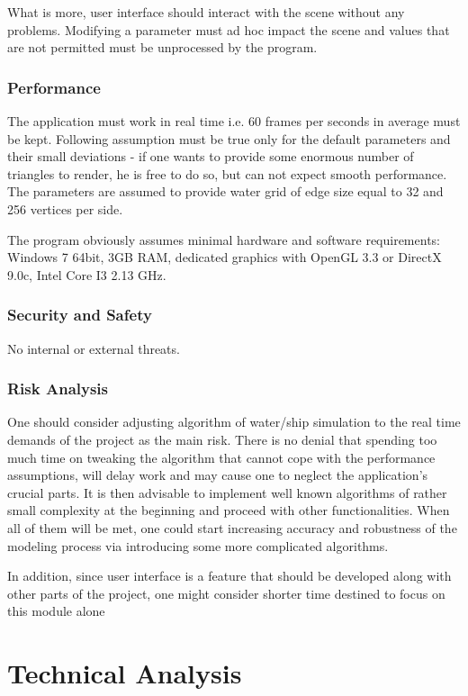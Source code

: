 \documentclass{report}
\begin{document}
What is more, user interface should interact with the scene without any problems. Modifying a parameter must ad hoc impact the scene and values that are not permitted must be unprocessed by the program.

\subsection{Performance}
The application must work in real time i.e. 60 frames per seconds in average must be kept. Following assumption must be true only for the default parameters and their small deviations - if one wants to provide some enormous number of triangles to render, he is free to do so, but can not expect smooth performance. The parameters are assumed to provide
water grid of edge size equal to 32 and 256 vertices per side.

The program obviously assumes minimal hardware and software requirements: Windows 7 64bit, 3GB RAM, dedicated graphics with OpenGL 3.3 or DirectX 9.0c, Intel Core I3 2.13 GHz.

\subsection{Security and Safety}
No internal or external threats.

\subsection{Risk Analysis}
One should consider adjusting algorithm of water/ship simulation to the real time demands of the project as the main risk. There is no denial that spending too much time on tweaking the algorithm that cannot cope with the performance assumptions, will delay work and may cause one to neglect the application’s crucial parts. It is then advisable to implement well known algorithms of rather small complexity at the beginning and proceed with other functionalities. When all of them will be met, one could start increasing accuracy and robustness of the modeling process via introducing
some more complicated algorithms.

In addition, since user interface is a feature that should be developed along with other parts of the project, one might
consider shorter time destined to focus on this module alone


\newpage
\chapter{Technical Analysis}
\end{document}
